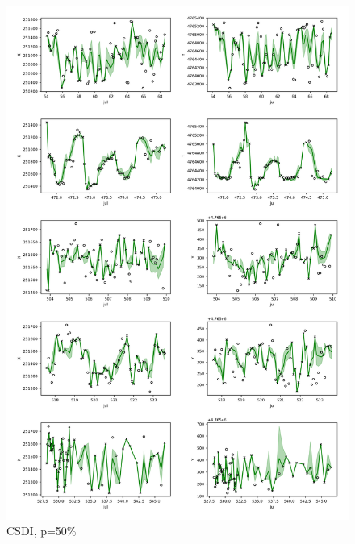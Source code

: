 \documentclass[11pt]{article}
\begin{document}
\begin{figure}[h]
  \centering
  \includegraphics[width=\textwidth]{../figure/50_5094_csdi} %
  \caption{CSDI, p=50\%}
  \label{fig: csdi_50} %
\end{figure}
\end{document}
